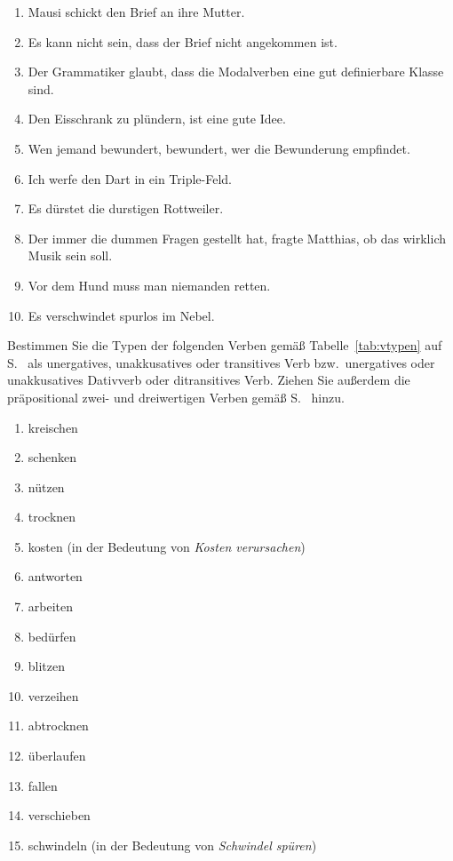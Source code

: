 \begin{enumerate}\Lf
  \item Mausi schickt den Brief an ihre Mutter.
  \item Es kann nicht sein, dass der Brief nicht angekommen ist.
  \item Der Grammatiker glaubt, dass die Modalverben eine gut definierbare Klasse sind.
  \item Den Eisschrank zu plündern, ist eine gute Idee.
  \item Wen jemand bewundert, bewundert, wer die Bewunderung empfindet.
  \item Ich werfe den Dart in ein Triple-Feld.
  \item Es dürstet die durstigen Rottweiler.
  \item Der immer die dummen Fragen gestellt hat, fragte Matthias, ob das wirklich Musik sein soll.
  \item Vor dem Hund muss man niemanden retten.
  \item Es verschwindet spurlos im Nebel.
\end{enumerate}

\Uebung \label{u132} Bestimmen Sie die Typen der folgenden Verben gemäß Tabelle~\ref{tab:vtypen} auf S.~\pageref{tab:vtypen} als unergatives, unakkusatives oder transitives Verb bzw.\ unergatives oder unakkusatives Dativverb oder ditransitives Verb.
Ziehen Sie außerdem die präpositional zwei- und dreiwertigen Verben gemäß S.~\pageref{abs:praepditrans} hinzu.

\begin{enumerate}\Lf
  \item kreischen
  \item schenken
  \item nützen
  \item trocknen
  \item kosten (in der Bedeutung von \textit{Kosten verursachen})
  \item antworten
  \item arbeiten 
  \item bedürfen
  \item blitzen
  \item verzeihen
  \item abtrocknen
  \item überlaufen
  \item fallen
  \item verschieben
  \item schwindeln (in der Bedeutung von \textit{Schwindel spüren})
\end{enumerate}

